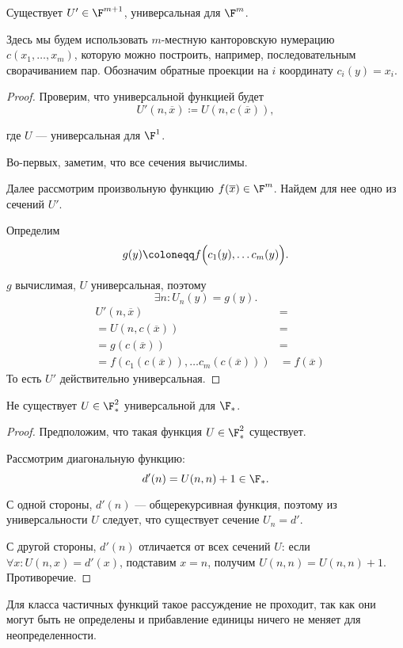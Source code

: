 \begin{cor}\label{cor:3}
    Существует $ U' \in  \F^{m+1}$, универсальная для $ \F^{m}$.
\end{cor}
\begin{note}
    Здесь мы будем использовать $ m$-местную канторовскую нумерацию $ c(x_1, \ldots , x_m)$, которую можно построить, например, последовательным сворачиванием пар.
	Обозначим обратные проекции на $ i$ координату $ c_i(y) = x_i$.
\end{note}
\begin{proof}
	Проверим, что универсальной функцией будет
	\[
		U'(n, \overline{x}) \coloneqq U(n, c(\overline{x}))
	,\] 

	где $ U$ --- универсальная для $ \F^{1}$.

	Во-первых, заметим, что все сечения вычислимы. 

	Далее рассмотрим произвольную функцию $ f(\overline{x}) \in \F^{m}$. Найдем для нее одно из сечений $ U'$.

	Определим 
 	\[
		g(y)\coloneqq f\Bigl(c_1(y), \ldots c_m(y)\Bigr)
	.\] 

	$ g$ вычислимая, $ U$ универсальная, поэтому 
	\[
		\exists n \colon  U_n(y) = g(y)
	.\] 
	\begin{align*}
		& U'(n, \overline{x}) &=  \tag{по определению  $U$} \\
		&=U(n, c(\overline{x})) &= \tag{$ n$ -- номер $g$} \\
		&=g(c(\overline{x})) &= \tag{по определению $g$} \\
		&= f(c_1(c(\overline{x})), \ldots c_{m}(c(\overline{x})))&= f(\overline{x})
	\end{align*}
	То есть $ U'$ действительно универсальная.
\end{proof}


\begin{thm}
    Не существует $ U \in \F_{*}^{2}$ универсальной для $ \F_{*}$.
\end{thm}
\begin{proof}
    Предположим, что такая функция $ U \in  \F_{*}^{2}$ существует.

	Рассмотрим диагональную функцию:
	\[
		d'(n) = U(n, n) + 1 \in \F_{*}
	.\] 

	С одной стороны, $ d'(n) $  --- общерекурсивная функция, поэтому из универсальности $ U$ следует, что существует сечение $ U_n = d'$.

	С другой стороны, $d'(n)$ отличается от всех сечений $ U$: 
	если $ \forall x \colon U(n, x) = d'(x)$, подставим $ x = n $, получим $U(n, n) = U(n, n ) + 1$. Противоречие. 
\end{proof}
\begin{note}
    Для класса частичных функций такое рассуждение не проходит, так как они могут быть не определены и прибавление единицы ничего не меняет для неопределенности.
\end{note}

